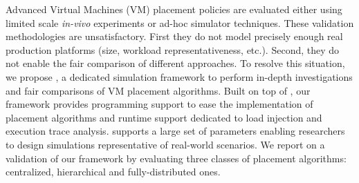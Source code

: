 

Advanced
Virtual Machines (VM) placement policies are evaluated either using
limited scale \emph{in-vivo} experiments or ad-hoc simulator
techniques. These validation methodologies are unsatisfactory. First
they do not model precisely enough real production platforms (size,
workload representativeness, etc.). Second, they do not enable the
fair comparison of different approaches. To resolve this situation, we
propose \vmps, a dedicated simulation framework to
perform in-depth investigations and fair comparisons of VM placement
algorithms. Built on top of \sg,
our
framework provides programming support to ease the implementation of
placement algorithms and runtime support dedicated to load injection
and execution trace analysis.
\vmps supports a large set of parameters enabling researchers to design simulations representative of
real-world scenarios.
We report on a validation
of our framework by evaluating three classes of placement algorithms:
centralized, hierarchical and fully-distributed ones.
